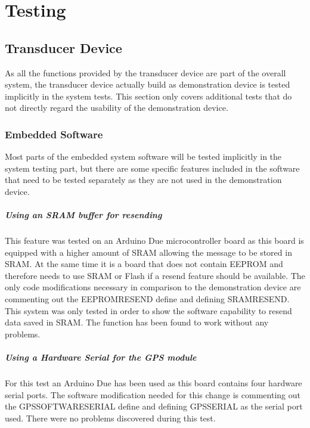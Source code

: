 \chapter{Testing}

\section{Transducer Device}
As all the functions provided by the transducer device are part of the overall system, the transducer device actually build as demonstration device is tested implicitly in the system tests. This section only covers additional tests that do not directly regard the usability of the demonstration device.

\subsection{Embedded Software}
Most parts of the embedded system software will be tested implicitly in the system testing part, but there are some specific features included in the software that need to be tested separately as they are not used in the demonstration device.

\paragraph{Using an SRAM buffer for resending}
This feature was tested on an Arduino Due microcontroller board as this board is equipped with a higher amount of SRAM allowing the message to be stored in SRAM. At the same time it is a board that does not contain EEPROM and therefore needs to use SRAM or Flash if a resend feature should be available. The only code modifications necessary in comparison to the demonstration device are commenting out the EEPROM\textunderscore RESEND define and defining SRAM\textunderscore RESEND. This system was only tested in order to show the software capability to resend data saved in SRAM. The function has been found to work without any problems.

\paragraph{Using a Hardware Serial for the GPS module}
For this test an Arduino Due has been used as this board contains four hardware serial ports. The software modification needed for this change is commenting out the GPS\textunderscore SOFTWARE\textunderscore SERIAL define and defining GPS\textunderscore SERIAL as the serial port used. There were no problems discovered during this test.

